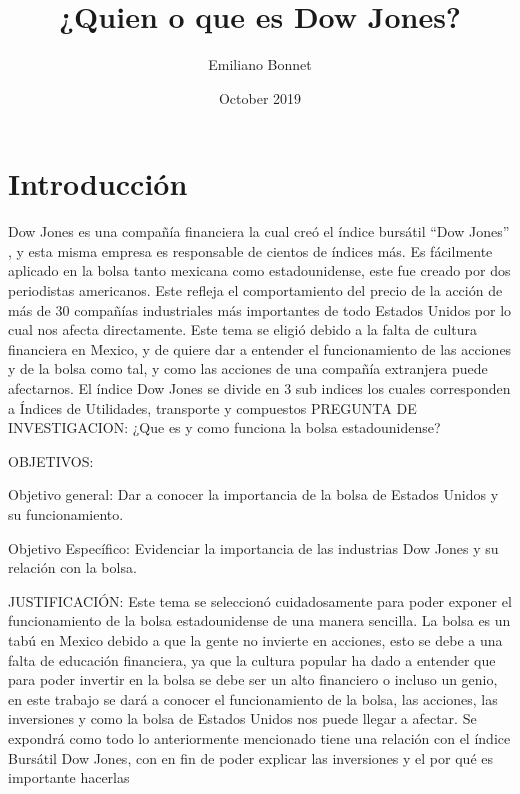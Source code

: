 \documentclass{article}
\title{¿Quien o que es Dow Jones?}
\author{Emiliano Bonnet }
\date{October 2019}
\begin{document}
\maketitle

\section{Introducción}
Dow Jones es una compañía financiera la cual creó el índice bursátil “Dow Jones” , y esta misma empresa es responsable de cientos de índices más. Es fácilmente aplicado en la bolsa tanto mexicana como estadounidense, este fue creado por dos periodistas americanos. Este refleja el comportamiento del precio de la acción de más de 30 compañías industriales más importantes de todo Estados Unidos por lo cual nos afecta directamente. Este tema se eligió debido a la falta de cultura financiera en Mexico, y de quiere dar a entender el funcionamiento de las acciones y de la bolsa como tal, y como las acciones de una compañía extranjera puede afectarnos. El índice Dow Jones se divide en 3 sub indices los cuales corresponden a Índices de Utilidades, transporte y compuestos 
PREGUNTA DE INVESTIGACION: ¿Que es y como funciona la bolsa estadounidense?

OBJETIVOS:

Objetivo general: Dar a conocer la importancia de la bolsa de Estados Unidos y su funcionamiento.

Objetivo Específico: Evidenciar la importancia de las industrias Dow Jones y su relación con la bolsa.

JUSTIFICACIÓN: Este tema se seleccionó cuidadosamente para poder exponer el funcionamiento de la bolsa estadounidense de una manera sencilla. La bolsa es un tabú en Mexico debido a que la gente no invierte en acciones, esto se debe a una falta de educación financiera, ya que la cultura popular ha dado a entender que para poder invertir en la bolsa se debe ser un alto financiero o incluso un genio, en este trabajo se dará a conocer el funcionamiento de la bolsa, las acciones, las inversiones y como la bolsa de Estados Unidos nos puede llegar a afectar. Se expondrá como todo lo anteriormente mencionado tiene una relación con el índice Bursátil Dow Jones, con en fin de poder explicar las inversiones y el por qué es importante hacerlas 
\end{document}
